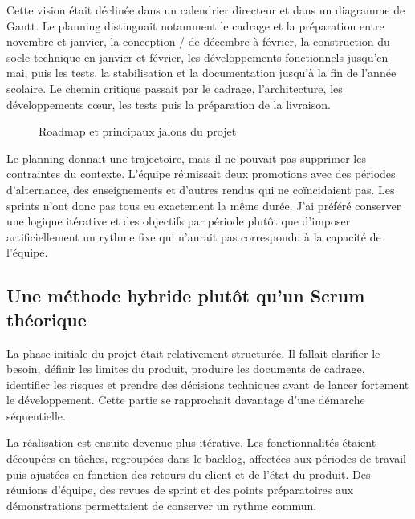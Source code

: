 Cette vision était déclinée dans un calendrier directeur et dans un diagramme de Gantt. Le planning distinguait notamment le cadrage et la préparation entre novembre et janvier, la conception / de décembre à février, la construction du socle technique en janvier et février, les développements fonctionnels jusqu'en mai, puis les tests, la stabilisation et la documentation jusqu'à la fin de l'année scolaire. Le chemin critique passait par le cadrage, l'architecture, les développements cœur, les tests puis la préparation de la livraison.

\begin{figure}[H]
\centering
{}
\caption{Roadmap et principaux jalons du projet}
\label{fig:lynx-roadmap}
\end{figure}

Le planning donnait une trajectoire, mais il ne pouvait pas supprimer les contraintes du contexte. L'équipe réunissait deux promotions avec des périodes d'alternance, des enseignements et d'autres rendus qui ne coïncidaient pas. Les sprints n'ont donc pas tous eu exactement la même durée. J'ai préféré conserver une logique itérative et des objectifs par période plutôt que d'imposer artificiellement un rythme fixe qui n'aurait pas correspondu à la capacité de l'équipe.

\subsection{Une méthode hybride plutôt qu'un Scrum théorique}

La phase initiale du projet était relativement structurée. Il fallait clarifier le besoin, définir les limites du produit, produire les documents de cadrage, identifier les risques et prendre des décisions techniques avant de lancer fortement le développement. Cette partie se rapprochait davantage d'une démarche séquentielle.

La réalisation est ensuite devenue plus itérative. Les fonctionnalités étaient découpées en tâches, regroupées dans le backlog, affectées aux périodes de travail puis ajustées en fonction des retours du client et de l'état du produit. Des réunions d'équipe, des revues de sprint et des points préparatoires aux démonstrations permettaient de conserver un rythme commun.

